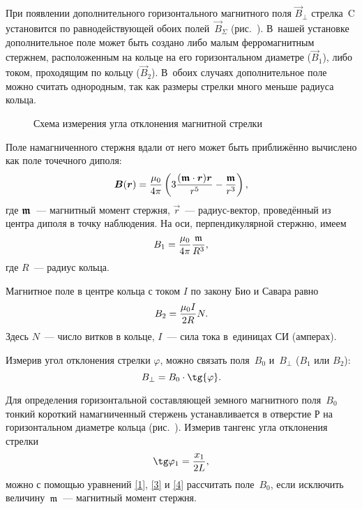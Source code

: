 При появлении дополнительного горизонтального магнитного поля $\vec{B}_{\perp}$
стрелка~C установится по равнодействующей обоих полей~$\vec{B}_{\Sigma}$
(рис.~). В~нашей
установке дополнительное поле может быть создано либо малым ферромагнитным
стержнем, расположенным на кольце на его горизонтальном диаметре ($\vec{B}_1$),
либо током, проходящим по кольцу ($\vec{B}_2$).
В~обоих случаях дополнительное поле можно считать однородным,
так как размеры стрелки много меньше радиуса кольца.

\begin{figure}
\centering
	\caption{Схема измерения угла отклонения магнитной стрелки}
\end{figure}

Поле намагниченного стержня вдали от него может быть приближённо
вычислено как поле точечного диполя:
\[
 {\boldsymbol{B}}({\boldsymbol{r}}) = \frac{\mu_0}{4\pi}
 \left(3\frac{({\boldsymbol{\mathfrak{m}}} \cdot {\boldsymbol{r}}){\boldsymbol{r}}}{r^5}
 - \frac{{\boldsymbol{\mathfrak{m}}}}{r^3}\right),
\]
где ${\boldsymbol{\mathfrak{m}}}$~--- магнитный момент стержня,
$\vec{r}$~--- радиус-вектор, проведённый из центра диполя в точку наблюдения.
На оси, перпендикулярной стержню, имеем
\begin{equation}
	\eqmark{1}
    B_1=\frac{\mu_0}{4\pi}\frac{\mm}{R^3},
\end{equation}
где $R$~--- радиус кольца.

Магнитное поле в центре кольца с током $I$ по закону Био и Савара равно
\begin{equation}
	\eqmark{2}
    B_2=\frac{\mu_0 I}{2R}N.
\end{equation}
Здесь $N$~--- число витков в кольце, $I$~--- сила тока в~единицах СИ (амперах).

Измерив угол отклонения стрелки $\varphi$, можно связать поля~$B_0$
и~$B_{\perp}$ ($B_1$ или $B_2$):
\begin{equation}
	\eqmark{3}
    B_{\perp}=B_0\cdot \tg{\varphi}.
\end{equation}



Для определения горизонтальной составляющей земного магнитного поля~$B_0$ тонкий
короткий намагниченный стержень
устанавливается в отверстие Р на горизонтальном диаметре кольца
(рис.~). Измерив тангенс угла отклонения стрелки
\begin{equation}
	\eqmark{4}
    \tg\varphi_1=\frac{x_1}{2L},
\end{equation}
можно с помощью уравнений \eqref{1}, \eqref{3} и \eqref{4} рассчитать
поле~$B_0$, если исключить величину~$\mathfrak{m}$~--- магнитный
момент стержня.

